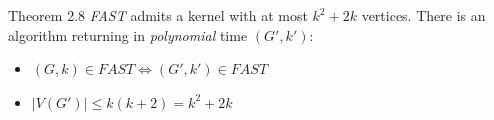 \documentclass{beamer}
\newcommand{\abs}[1]{\left| #1 \right|}
\begin{document}
	\begin{frame}[fragile]{Theorem 2.8}
		\textit{FAST} admits a kernel with at most \(k^{2} + 2k\) vertices. \newline 
		\newline
		There is an algorithm returning in \textit{polynomial} time \((G',k'): \)
		\begin{itemize}
			\item \((G,k) \in FAST \Leftrightarrow (G', k') \in FAST \)
			\item \(\abs{V(G')} \leq k(k+2) = k^2 + 2k \)
		\end{itemize}
	\end{frame}
	
\end{document}
